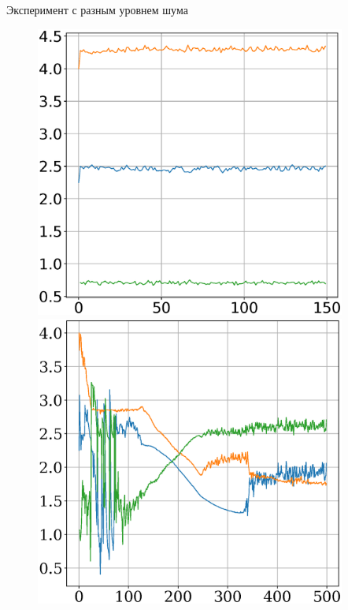 \documentclass[10pt,pdf,hyperref={unicode}]{beamer}
\begin{document}
\begin{frame}{Эксперимент с разным уровнем шума}
\begin{figure}[h]
\begin{minipage}{.27\textwidth}
      \includegraphics[width = 0.91\textwidth]{figures/911noise.eps}
\end{minipage}
\begin{minipage}{.27\textwidth}
\vspace{0.3mm}
      \includegraphics[width = 0.91\textwidth]{figures/912noise.eps}
\end{minipage}
\begin{minipage}{.27\textwidth}

\end{minipage}
\end{figure}
\end{frame}
\end{document}
